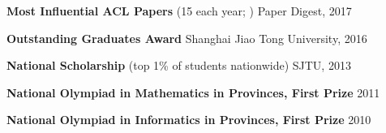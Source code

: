 \vspace{-2mm}
\noindent \textbf{Most Influential ACL Papers} {\small (15 each year; )} \hfill Paper Digest, 2017

\vspace{-2mm}
\noindent \textbf{Outstanding Graduates Award} \hfill Shanghai Jiao Tong University, 2016

\vspace{-2mm}
\noindent \textbf{National Scholarship} {\small (top 1\% of students nationwide)} \hfill SJTU, 2013

\vspace{-2mm}
\noindent \textbf{National Olympiad in Mathematics in Provinces, First Prize} \hfill 2011

\vspace{-2mm}
\noindent \textbf{National Olympiad in Informatics in Provinces, First Prize} \hfill 2010


\vspace{1mm}

